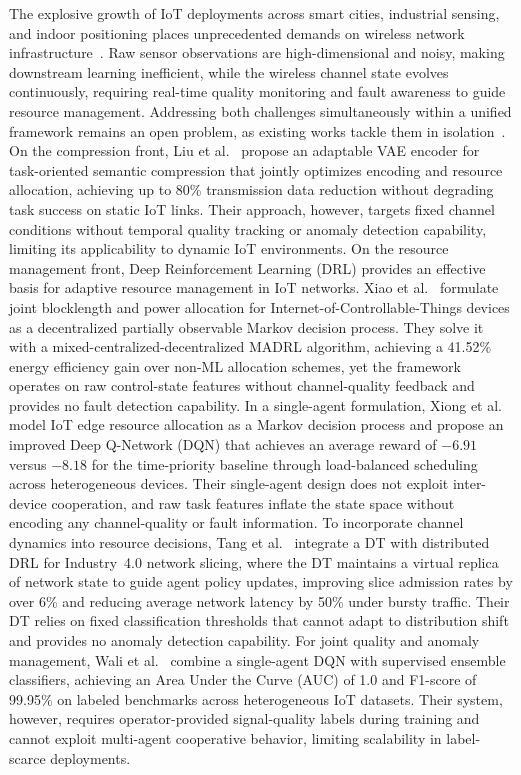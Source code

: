 \documentclass[conference]{IEEEtran}
\begin{document}
The explosive growth of IoT deployments across smart cities, industrial sensing, and indoor positioning places unprecedented demands on wireless network infrastructure~\cite{ref_iot_overview}. Raw sensor observations are high-dimensional and noisy, making downstream learning inefficient, while the wireless channel state evolves continuously, requiring real-time quality monitoring and fault awareness to guide resource management. Addressing both challenges simultaneously within a unified framework remains an open problem, as existing works tackle them in isolation~\cite{ref_vae_wireless,ref_drl_iot}. On the compression front, Liu et al.~\cite{ref_vae_wireless} propose an adaptable VAE encoder for task-oriented semantic compression that jointly optimizes encoding and resource allocation, achieving up to 80\% transmission data reduction without degrading task success on static IoT links. Their approach, however, targets fixed channel conditions without temporal quality tracking or anomaly detection capability, limiting its applicability to dynamic IoT environments.
On the resource management front, Deep Reinforcement Learning (DRL) provides an effective basis for adaptive resource management in IoT networks. Xiao et al.~\cite{ref_drl_comm2} formulate joint blocklength and power allocation for Internet-of-Controllable-Things devices as a decentralized partially observable Markov decision process. They solve it with a mixed-centralized-decentralized MADRL algorithm, achieving a 41.52\% energy efficiency gain over non-ML allocation schemes, yet the framework operates on raw control-state features without channel-quality feedback and provides no fault detection capability. In a single-agent formulation, Xiong et al.~\cite{ref_drl_iot} model IoT edge resource allocation as a Markov decision process and propose an improved Deep Q-Network (DQN) that achieves an average reward of $-6.91$ versus $-8.18$ for the time-priority baseline through load-balanced scheduling across heterogeneous devices. Their single-agent design does not exploit inter-device cooperation, and raw task features inflate the state space without encoding any channel-quality or fault information.
To incorporate channel dynamics into resource decisions, Tang et al.~\cite{ref_dt_resource} integrate a DT with distributed DRL for Industry~4.0 network slicing, where the DT maintains a virtual replica of network state to guide agent policy updates, improving slice admission rates by over 6\% and reducing average network latency by 50\% under bursty traffic. Their DT relies on fixed classification thresholds that cannot adapt to distribution shift and provides no anomaly detection capability. For joint quality and anomaly management, Wali et al.~\cite{ref_wali2025} combine a single-agent DQN with supervised ensemble classifiers, achieving an Area Under the Curve (AUC) of 1.0 and F1-score of 99.95\% on labeled benchmarks across heterogeneous IoT datasets. Their system, however, requires operator-provided signal-quality labels during training and cannot exploit multi-agent cooperative behavior, limiting scalability in label-scarce deployments.
\end{document}
